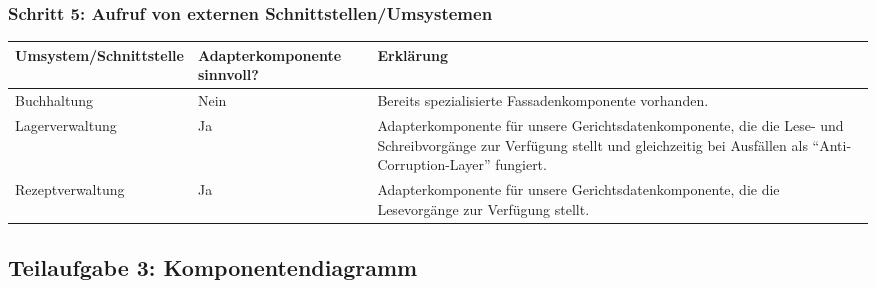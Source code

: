 
\subsubsection{Schritt 5: Aufruf von externen Schnittstellen/Umsystemen}

\begin{tabu} to \linewidth {X|X|X}
\hline
{}
Umsystem/Schnittstelle &Adapterkomponente sinnvoll? &Erkl\"arung \\
\hline
Buchhaltung &Nein &Bereits spezialisierte Fassadenkomponente vorhanden. \\
\hline
Lagerverwaltung &Ja &Adapterkomponente f\"ur unsere Gerichtsdatenkomponente,
  die die Lese- und Schreibvorg\"ange zur Verf\"ugung stellt und gleichzeitig
  bei Ausf\"allen als "`Anti-Corruption-Layer"' fungiert. \\
\hline
Rezeptverwaltung &Ja &Adapterkomponente f\"ur unsere Gerichtsdatenkomponente,
  die die Lesevorg\"ange zur Verf\"ugung stellt. \\
\hline
\end{tabu}



\subsection{Teilaufgabe 3: Komponentendiagramm}

